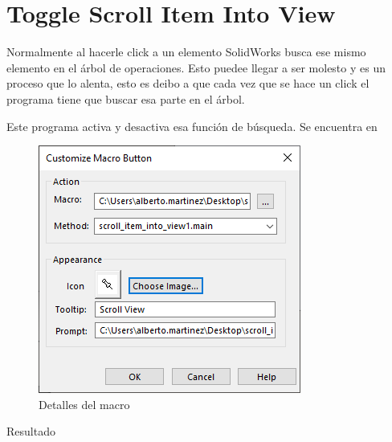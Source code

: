 \documentclass{report}
\begin{document}
\section{Toggle Scroll Item Into View}

Normalmente al hacerle click a un elemento SolidWorks busca ese mismo elemento en el árbol de operaciones. Esto puedee llegar a ser molesto y es un proceso que lo alenta, esto es deibo a que cada vez que se hace un click el programa tiene que buscar esa parte en el árbol.

Este programa activa y desactiva esa función de búsqueda. Se encuentra en 

\begin{figure}[H]
	\centering
	\includegraphics[width=0.55\linewidth, height=0.5\textheight,keepaspectratio]{Imagenes/solidworks_macro_08}
	\caption{Detalles del macro}
	\label{fig:solidworksmacro08}
\end{figure}

{\LARGE Resultado}
\end{document}
